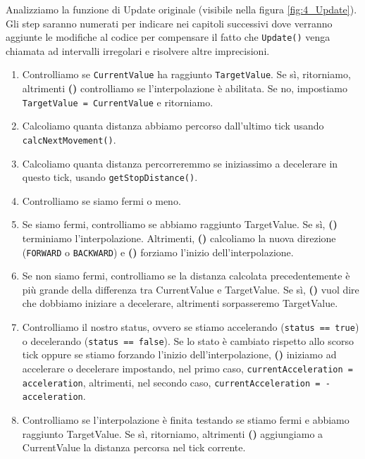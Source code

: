 \documentclass[main.tex]{subfiles}
\begin{document}
Analizziamo la funzione di Update originale (visibile nella figura \ref{fig:4_Update}). Gli step saranno numerati per indicare nei capitoli successivi dove verranno aggiunte le modifiche al codice per compensare il fatto che \lstinline{Update()} venga chiamata ad intervalli irregolari e risolvere altre imprecisioni.
\newcommand{\itemEnu}{\stepcounter{enumi}\textbf{(\number\numexpr\value{enumi}\relax) }}
\begin{enumerate}
    \item Controlliamo se \lstinline{CurrentValue} ha raggiunto \lstinline{TargetValue}. Se sì, ritorniamo, altrimenti \itemEnu controlliamo se l'interpolazione è abilitata. Se no, impostiamo \lstinline{TargetValue = CurrentValue} e ritorniamo.
    \item Calcoliamo quanta distanza abbiamo percorso dall'ultimo tick usando \lstinline{calcNextMovement()}.
    \item Calcoliamo quanta distanza percorreremmo se iniziassimo a decelerare in questo tick, usando \lstinline{getStopDistance()}.
    \item Controlliamo se siamo fermi o meno.
    \item Se siamo fermi, controlliamo se abbiamo raggiunto TargetValue. Se sì, \itemEnu terminiamo l'interpolazione. Altrimenti, \itemEnu calcoliamo la nuova direzione (\lstinline{FORWARD} o \lstinline{BACKWARD}) e \itemEnu forziamo l'inizio dell'interpolazione.
    \item Se non siamo fermi, controlliamo se la distanza calcolata precedentemente è più grande della differenza tra CurrentValue e TargetValue. Se sì, \itemEnu vuol dire che dobbiamo iniziare a decelerare, altrimenti sorpasseremo TargetValue.
    \item Controlliamo il nostro status, ovvero se stiamo accelerando (\lstinline{status == true}) o decelerando (\lstinline{status == false}). Se lo stato è cambiato rispetto allo scorso tick oppure se stiamo forzando l'inizio dell'interpolazione, \itemEnu iniziamo ad accelerare o decelerare impostando, nel primo caso, \lstinline{currentAcceleration = acceleration}, altrimenti, nel secondo caso, \lstinline{currentAcceleration = -acceleration}.
    \item Controlliamo se l'interpolazione è finita testando se stiamo fermi e abbiamo raggiunto TargetValue. Se sì, ritorniamo, altrimenti \itemEnu aggiungiamo a CurrentValue la distanza percorsa nel tick corrente.
\end{enumerate}
\end{document}
